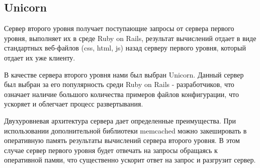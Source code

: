\subsection{Unicorn}
Сервер второго уровня получает поступающие запросы от сервера первого уровня,
выполняет их в среде Ruby on Rails, результат вычислений отдает в виде
стандартных веб-файлов (css, html, js) назад серверу первого уровня, который
отдает  их уже клиенту.

В качестве сервера второго уровня нами был выбран Unicorn. Данный сервер был
выбран за его популярность среди Ruby on Rails - разработчиков, что означает
наличие большого количества примеров файлов конфигурации, что ускоряет и
облегчает процесс развертывания.

Двухуровневая архитектура сервера дает определенные преимущества. При
использовании дополнительной библиотеки memcached можно закешировать в
оперативную память результаты вычислений сервера второго уровня. В этом случае
сервер первого уровня будет отвечать на запросы обращаясь к оперативной памяи,
что существенно ускорит ответ на запрос и разгрузит сервер.
